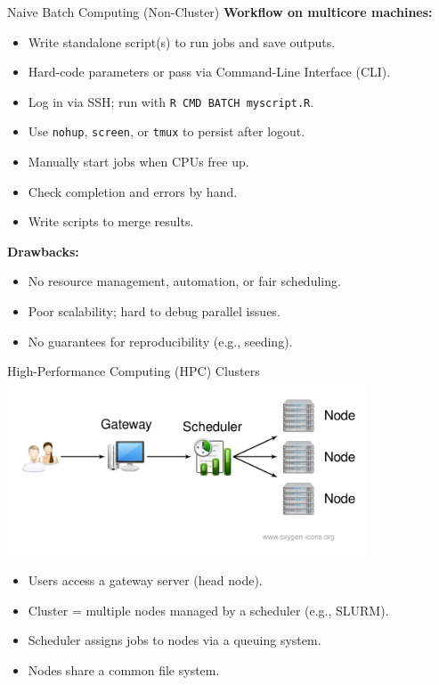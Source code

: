 \documentclass[10pt,compress,t,notes=noshow, xcolor=table]{beamer}
\begin{document}
\begin{frame}[fragile]{Naive Batch Computing (Non-Cluster)}
\textbf{Workflow on multicore machines:}
\begin{itemize}
  \item Write standalone script(s) to run jobs and save outputs.
  \item Hard-code parameters or pass via Command-Line Interface (CLI).
  \item Log in via SSH; run with \texttt{R CMD BATCH myscript.R}.
  \item Use \texttt{nohup}, \texttt{screen}, or \texttt{tmux} to persist after logout.
  \item Manually start jobs when CPUs free up.
  \item Check completion and errors by hand.
  \item Write scripts to merge results.
\end{itemize}

\vspace{1em}
\textbf{Drawbacks:}
\begin{itemize}
  \item No resource management, automation, or fair scheduling.
  \item Poor scalability; hard to debug parallel issues.
  \item No guarantees for reproducibility (e.g., seeding).
\end{itemize}
\end{frame}

\begin{frame}[fragile]{High-Performance Computing (HPC) Clusters}
\includegraphics[width=0.8\textwidth]{figure/hpc.png}
\vspace{1em}
\begin{itemize}
  \item Users access a gateway server (head node).
  \item Cluster = multiple nodes managed by a scheduler (e.g., SLURM).
  \item Scheduler assigns jobs to nodes via a queuing system.
  \item Nodes share a common file system.
\end{itemize}
\end{frame}
\end{document}
